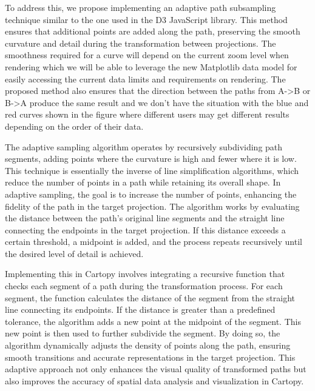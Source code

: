 \documentclass[12pt]{article}
\numberwithin{page}{section}
\begin{document}
To address this, we propose implementing an adaptive path subsampling technique similar to
the one used in the D3 JavaScript library. This method ensures that additional points are
added along the path, preserving the smooth curvature and detail during the
transformation between projections. The smoothness required for a curve will depend on the current
zoom level when rendering which we will be able to leverage the new Matplotlib data model for easily
accessing the current data limits and requirements on rendering. The proposed method also ensures that
the direction between the paths from
A->B or B->A produce the same result and we don't have the situation with the blue and red curves
shown in the figure where different users may get different results depending on the order of their data.


The adaptive sampling algorithm operates by recursively subdividing path segments,
adding points where the curvature is high and fewer where it is low.
This technique is essentially the inverse of line simplification algorithms,
which reduce the number of points in a path while retaining its overall shape.
In adaptive sampling, the goal is to increase the number of points, enhancing the
fidelity of the path in the target projection. The algorithm works by evaluating
the distance between the path's original line segments and the straight line
connecting the endpoints in the target projection. If this distance exceeds a
certain threshold, a midpoint is added, and the process repeats recursively until
the desired level of detail is achieved.

Implementing this in Cartopy involves integrating a recursive function that checks
each segment of a path during the transformation process. For each segment, the
function calculates the distance of the segment from the straight line connecting
its endpoints. If the distance is greater than a predefined tolerance, the algorithm
adds a new point at the midpoint of the segment. This new point is then used to further subdivide
the segment. By doing so, the algorithm dynamically adjusts the density of points along the path,
ensuring smooth transitions and accurate representations in the target projection.
This adaptive approach not only enhances the visual quality of transformed paths
but also improves the accuracy of spatial data analysis and visualization in Cartopy.
\end{document}
